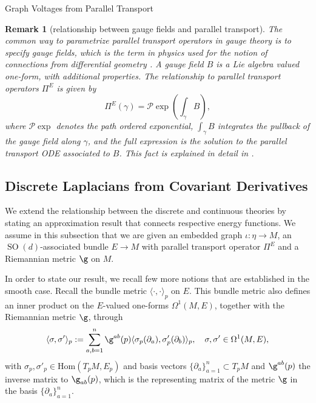 \documentclass[10pt,reqno]{amsart}
\numberwithin{equation}{section}
\theoremstyle{bfnote}
\theoremstyle{bfdef}
\newtheorem{remark}[theorem]{Remark}
\newcommand{\mc}[1]{\mathcal{#1}}
\newcommand{\la}{\langle}
\newcommand{\ra}{\rangle}
\DeclareMathOperator{\SO}{SO}
\begin{document}
\begin{subsection}{Graph Voltages from Parallel Transport}
	\begin{remark}[relationship between gauge fields and parallel transport]
		The common way to parametrize parallel transport operators in gauge theory is to specify \textit{gauge fields}, which is the term in physics used for the notion of \textit{connections} from differential geometry \cite{hamiltonMathematicalGaugeTheory2017}. A gauge field $B$ is a Lie algebra valued one-form, with additional properties. The relationship to parallel transport operators $\Pi^{E}$ is given by \cite{Gattringer:2010zz}
		\begin{equation}
			\Pi^{E}(\gamma) = \mc{P} \exp \left(\int_{\gamma} B \right),
		\end{equation}
		where $\mc{P} \exp$ denotes the \textit{path ordered exponential}, $\int_{\gamma} B$ integrates the pullback of the gauge field along $\gamma$, and the full expression is the solution to the parallel transport ODE associated to $B$. This fact is explained in detail in \cite[Section 5.10]{hamiltonMathematicalGaugeTheory2017}.
	\end{remark}

\end{subsection}

\subsection{Discrete Laplacians from Covariant Derivatives}
	We extend the relationship between the discrete and continuous theories by stating an approximation result that connects respective energy functions. We assume in this subsection that we are given an embedded graph $\iota : \eta \to M$, an $\SO(d)$-associated bundle $E \to M$ with parallel transport operator $\Pi^{E}$ and a Riemannian metric $\g$ on $M$. 

In order to state our result, we recall few more notions that are established in the smooth case. Recall the bundle metric $\la\cdot,\cdot\ra_p$ on $E$. This bundle metric also defines an inner product on the $E$-valued one-forms $\Omega^{1}(M,E)$, together with the Riemannian metric $\g$, through
\begin{equation}\label{eq:sigma-times-0}
\la \sigma,\sigma'\ra_{p} 
:= \sum_{a,b=1}^{n} \g^{a b}(p)\la \sigma_{p}(\partial_{a}),\sigma'_{p}(\partial_{b})\ra_{p},\quad
\sigma, \sigma' \in \Omega^{1}(M,E),
\end{equation}
with $\sigma_{p}, \sigma'_{p}\in\mathrm{Hom}(T_{p}M, E_{p})$ and basis vectors $\{\partial_{a}\}_{a=1}^{n}\subset T_{p}M$ and $\g^{ab}(p)$ the inverse matrix to $\g_{ab}(p)$, which is the representing matrix of the metric $\g$ in the basis $\{\partial_{a}\}_{a=1}^{n}$.
\end{document}

